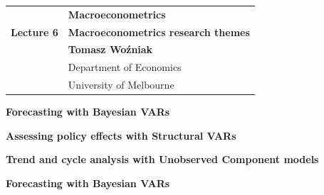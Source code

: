 \documentclass[notes,blackandwhite,mathsans]{beamer}
\begin{document}






{
\begin{frame}

\vspace{1cm}
\begin{tabular}{rl}
&\textbf{\LARGE\color{mcxs1} Macroeconometrics}\\[6ex]
\textbf{\color{mcxs3}\Large Lecture 6}&\textbf{\Large\color{mcxs3}Macroeconometrics research themes}\\[19ex]
&\textbf{\color{mcxs1} Tomasz Wo\'zniak}\\[1ex]
&{\small\color{mcxs3} Department of Economics}\\
&{\small\color{mcxs3}University of Melbourne}
\end{tabular}

\end{frame}
}






{
\begin{frame}


\bigskip\textbf{\color{mcxs3}Forecasting with Bayesian VARs}

\bigskip\textbf{\color{mcxs1}Assessing policy effects with Structural VARs}

\bigskip\textbf{\color{mcxs3}Trend and cycle analysis with Unobserved Component models}

\end{frame}
}














{
\begin{frame}

\begin{adjustwidth}{-0.5cm}{0cm}
\vspace{8.3cm}\Large
\textbf{{\color{mcxs2}Forecasting with} {\color{mcxs1}Bayesian VARs}}
\end{adjustwidth}

\end{frame}
}
\end{document}
